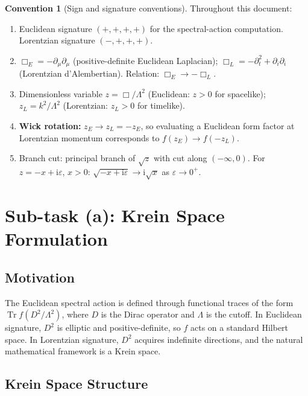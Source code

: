 \documentclass[11pt,a4paper]{article}
\theoremstyle{definition}
\newtheorem{convention}[proposition]{Convention}
\theoremstyle{remark}
\newcommand{\Tr}{\operatorname{Tr}}
\newcommand{\ii}{\mathrm{i}}
\begin{document}
\begin{convention}[Sign and signature conventions]
\label{conv:signs}
Throughout this document:
\begin{enumerate}[nosep]
  \item Euclidean signature $(+,+,+,+)$ for the spectral-action
    computation.  Lorentzian signature $(-,+,+,+)$.
  \item $\Box_E = -\partial_\mu\partial_\mu$ (positive-definite
    Euclidean Laplacian); $\Box_L = -\partial_t^2 +
    \partial_i\partial_i$ (Lorentzian d'Alembertian).  Relation:
    $\Box_E \to -\Box_L$.
  \item Dimensionless variable $z = \Box/\Lambda^2$ (Euclidean: $z > 0$
    for spacelike); $z_L = k^2/\Lambda^2$ (Lorentzian: $z_L > 0$ for
    timelike).
  \item \textbf{Wick rotation:} $z_E \to z_L = -z_E$, so evaluating a
    Euclidean form factor at Lorentzian momentum corresponds to
    $f(z_E) \to f(-z_L)$.
  \item Branch cut: principal branch of $\sqrt{z}$ with cut along
    $(-\infty, 0)$.  For $z = -x + \ii\varepsilon$, $x > 0$:
    $\sqrt{-x + \ii\varepsilon} \to \ii\sqrt{x}$ as
    $\varepsilon \to 0^+$.
\end{enumerate}
\end{convention}


\section{Sub-task (a): Krein Space Formulation}
\label{sec:krein}

\subsection{Motivation}

The Euclidean spectral action is defined through functional traces of
the form $\Tr f(D^2/\Lambda^2)$, where $D$ is the Dirac operator and
$\Lambda$ is the cutoff.  In Euclidean signature, $D^2$ is elliptic and
positive-definite, so $f$ acts on a standard Hilbert space.  In
Lorentzian signature, $D^2$ acquires indefinite directions, and the
natural mathematical framework is a Krein space.

\subsection{Krein Space Structure}
\end{document}
